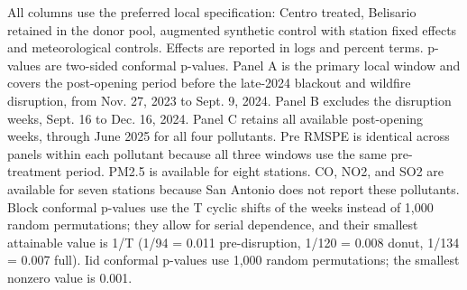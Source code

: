\begin{table}[htbp]
\begin{threeparttable}
\begin{tablenotes}
\item All columns use the preferred local specification: Centro treated, Belisario retained in the donor pool, augmented synthetic control with station fixed effects and meteorological controls. Effects are reported in logs and percent terms. p-values are two-sided conformal p-values. Panel A is the primary local window and covers the post-opening period before the late-2024 blackout and wildfire disruption, from Nov. 27, 2023 to Sept. 9, 2024. Panel B excludes the disruption weeks, Sept. 16 to Dec. 16, 2024. Panel C retains all available post-opening weeks, through June 2025 for all four pollutants. Pre RMSPE is identical across panels within each pollutant because all three windows use the same pre-treatment period. PM2.5 is available for eight stations. CO, NO2, and SO2 are available for seven stations because San Antonio does not report these pollutants. Block conformal p-values use the T cyclic shifts of the weeks instead of 1,000 random permutations; they allow for serial dependence, and their smallest attainable value is 1/T (1/94 = 0.011 pre-disruption, 1/120 = 0.008 donut, 1/134 = 0.007 full). Iid conformal p-values use 1,000 random permutations; the smallest nonzero value is 0.001.
\end{tablenotes}
\end{threeparttable}
\end{table}
